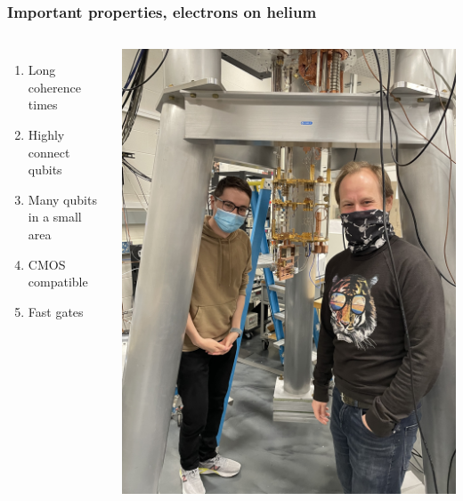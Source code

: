 \documentclass{beamer}
\begin{document}
\frame
    {
      \frametitle{Important properties, electrons on helium}
	
      \begin{footnotesize}
     \begin{columns}
       \column{5.0cm}
\begin{enumerate}
\item Long coherence times

\item Highly connect qubits

\item Many qubits in a small area

\item CMOS compatible

\item Fast gates
\end{enumerate}

\column{5cm}
      \begin{center}
	\includegraphics[width=1.2\textwidth]{qcfigures/lab.jpeg}
      \end{center}
\end{columns}
      \end{footnotesize}
    }
\end{document}
